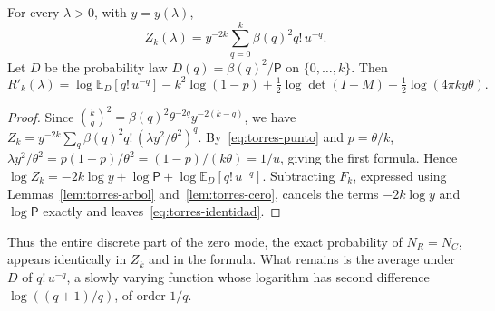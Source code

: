 \begin{lema}\label{lem:torres-identidad}
For every $\lambda>0$, with $y=y(\lambda)$,
\[
 Z_k(\lambda)=y^{-2k}\sum_{q=0}^k\beta(q)^2q!\,u^{-q}.
\]
Let $D$ be the probability law $D(q)=\beta(q)^2/\mathsf P$ on $\{0,\dots,k\}$. Then
\begin{equation}\label{eq:torres-identidad}
 R'_k(\lambda)=\log\mathbb E_D[q!\,u^{-q}]-k^2\log(1-p)+\tfrac12\log\det(I+M)-\tfrac12\log(4\pi ky\theta).
\end{equation}
\end{lema}
\begin{proof}
Since $\binom kq^2=\beta(q)^2\theta^{-2q}y^{-2(k-q)}$, we have
$Z_k=y^{-2k}\sum_q\beta(q)^2q!\,(\lambda y^2/\theta^2)^q$. By~\eqref{eq:torres-punto} and $p=\theta/k$,
$\lambda y^2/\theta^2=p(1-p)/\theta^2=(1-p)/(k\theta)=1/u$, giving the first formula. Hence
$\log Z_k=-2k\log y+\log\mathsf P+\log\mathbb E_D[q!\,u^{-q}]$. Subtracting $F_k$, expressed using
Lemmas~\ref{lem:torres-arbol} and~\ref{lem:torres-cero}, cancels the terms $-2k\log y$ and $\log\mathsf P$
exactly and leaves~\eqref{eq:torres-identidad}.
\end{proof}

Thus the entire discrete part of the zero mode, the exact probability of $N_R=N_C$, appears identically in
$Z_k$ and in the formula. What remains is the average under $D$ of $q!\,u^{-q}$, a slowly varying
function whose logarithm has second difference $\log((q+1)/q)$, of order $1/q$.
